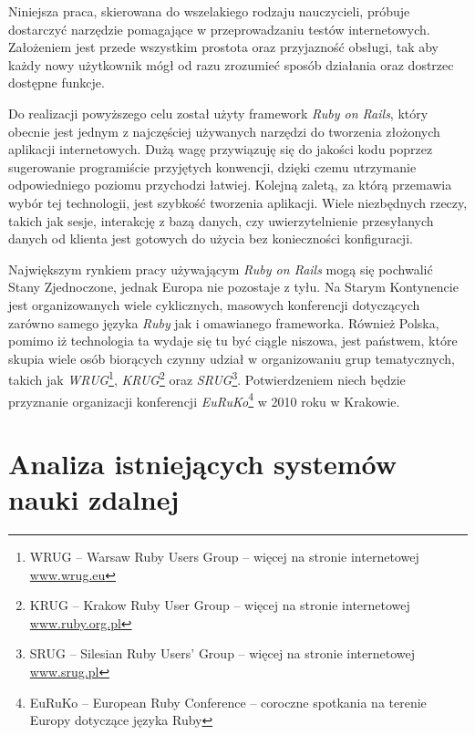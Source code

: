\documentclass[12pt,twoside]{report}
\begin{document}
Niniejsza praca, skierowana do wszelakiego rodzaju nauczycieli, próbuje dostarczyć
narzędzie pomagające w przeprowadzaniu testów internetowych. Założeniem jest przede
wszystkim prostota oraz przyjazność obsługi, tak aby każdy nowy użytkownik mógł od razu
zrozumieć sposób działania oraz dostrzec dostępne funkcje.


Do realizacji powyższego celu został użyty framework \emph{Ruby on Rails}, który obecnie
jest jednym z najczęściej używanych narzędzi do tworzenia złożonych aplikacji internetowych.
Dużą wagę przywiązuję się do jakości kodu poprzez sugerowanie programiście
przyjętych konwencji, dzięki czemu utrzymanie odpowiedniego poziomu przychodzi łatwiej.
Kolejną zaletą, za którą przemawia wybór tej technologii, jest szybkość tworzenia
aplikacji. Wiele niezbędnych rzeczy, takich jak sesje, interakcję z bazą danych,
czy uwierzytelnienie przesyłanych danych od klienta jest gotowych do użycia bez konieczności
konfiguracji.


Największym rynkiem pracy używającym \emph{Ruby on Rails} mogą się pochwalić Stany
Zjednoczone, jednak Europa nie pozostaje z tyłu. Na Starym Kontynencie jest organizowanych
wiele cyklicznych, masowych konferencji dotyczących zarówno samego języka \emph{Ruby} jak
i omawianego frameworka. Również Polska, pomimo iż technologia ta wydaje się tu być ciągle
niszowa, jest państwem, które skupia wiele osób biorących czynny udział w organizowaniu
grup tematycznych, takich jak \emph{WRUG}\footnote{WRUG -- Warsaw Ruby Users Group -- więcej
na stronie internetowej \url{www.wrug.eu}}, \emph{KRUG}\footnote{KRUG -- Krakow Ruby User Group
-- więcej na stronie internetowej \url{www.ruby.org.pl}} oraz \emph{SRUG}\footnote{SRUG -- Silesian Ruby
Users' Group -- więcej na stronie internetowej \url{www.srug.pl}}. Potwierdzeniem niech
będzie przyznanie organizacji konferencji \emph{EuRuKo}\footnote{EuRuKo -- European Ruby
Conference -- coroczne spotkania na terenie Europy dotyczące języka Ruby} w 2010 roku w Krakowie.


\chapter{Analiza istniejących systemów nauki zdalnej}
\end{document}
